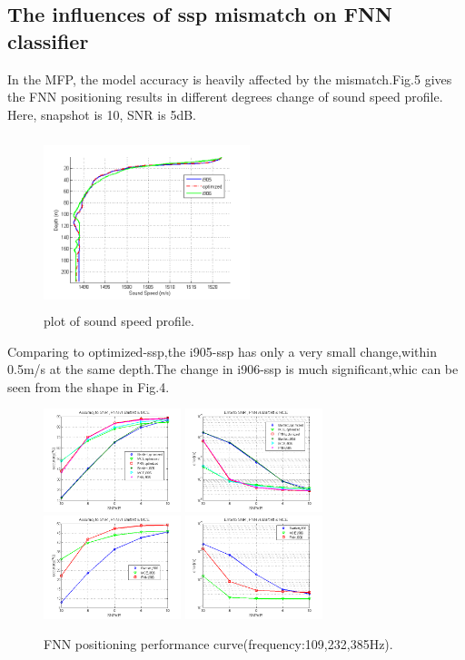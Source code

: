 \subsection{The influences of ssp mismatch on FNN classifier}
In the MFP, the model accuracy is heavily affected by the mismatch.Fig.5 gives the FNN positioning results in different degrees change of sound speed profile. Here, snapshot is 10, SNR is 5dB.
\begin{figure}
\includegraphics[width=6cm,height=5cm]{figure/ssp3}
\caption{plot of sound speed profile.}
\end{figure}
Comparing to optimized-ssp,the i905-ssp has only a very small change,within 0.5m/s at the same depth.The change in i906-ssp is much significant,whic can be seen from the shape in Fig.4.
\begin{figure}
\includegraphics[width=4cm,height=3cm]{figure/Accuracy_to_SNR_FNN_vs_Bartlett_MCE}
\includegraphics[width=4cm,height=3cm]{figure/Error_to_SNR_FNN_vs_Bartlett_MCE}
\includegraphics[width=4cm,height=3cm]{figure/Accuracy_to_SNR_FNN_vs_Bartlett_MCE_i906}
\includegraphics[width=4cm,height=3cm]{figure/Error_to_SNR_FNN_vs_Bartlett_MCE_i906}
\caption{FNN positioning performance curve(frequency:109,232,385Hz).}
\end{figure}

